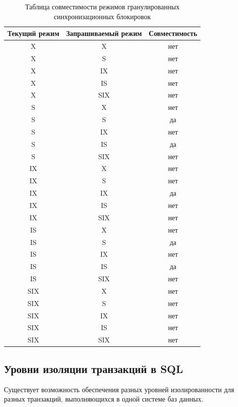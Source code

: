 \documentclass[a4paper,12pt]{article}
\begin{document}
\begin{table}[h!]
    \centering
    \begin{tabular}{|c|c|c|}
        \hline
        \textbf{Текущий режим} & \textbf{Запрашиваемый режим} & \textbf{Совместимость} \\
        \hline
        X & X & нет \\
        X & S & нет \\
        X & IX & нет \\
        X & IS & нет \\
        X & SIX & нет \\
        \hline
        S & X & нет \\
        S & S & да \\
        S & IX & нет \\
        S & IS & да \\
        S & SIX & нет \\
        \hline
        IX & X & нет \\
        IX & S & нет \\
        IX & IX & да \\
        IX & IS & нет \\
        IX & SIX & нет \\
        \hline
        IS & X & нет \\
        IS & S & да \\
        IS & IX & нет \\
        IS & IS & да \\
        IS & SIX & нет \\
        \hline
        SIX & X & нет \\
        SIX & S & нет \\
        SIX & IX & нет \\
        SIX & IS & нет \\
        SIX & SIX & нет \\
        \hline
    \end{tabular}
    \caption{Таблица совместимости режимов гранулированных синхронизационных блокировок}
\end{table}

\subsection{Уровни изоляции транзакций в SQL}

Существует возможность обеспечения разных уровней изолированности для разных транзакций, выполняющихся в одной системе баз данных.
\end{document}
